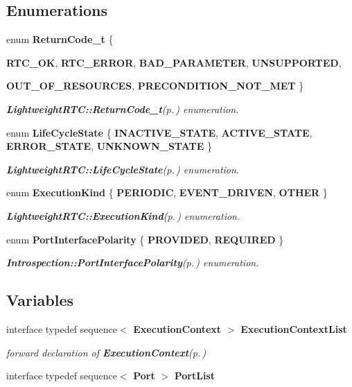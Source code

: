 \subsection*{Enumerations}
\begin{CompactItemize}
\item 
enum {\bf Return\-Code\_\-t} \{ \par
{\bf RTC\_\-OK}, 
{\bf RTC\_\-ERROR}, 
{\bf BAD\_\-PARAMETER}, 
{\bf UNSUPPORTED}, 
\par
{\bf OUT\_\-OF\_\-RESOURCES}, 
{\bf PRECONDITION\_\-NOT\_\-MET}
 \}
\begin{CompactList}\small\item\em {\bf Lightweight\-RTC::Return\-Code\_\-t}{\rm (p.\,\pageref{namespaceRTC_a28})} enumeration. \item\end{CompactList}\item 
enum {\bf Life\-Cycle\-State} \{ {\bf INACTIVE\_\-STATE}, 
{\bf ACTIVE\_\-STATE}, 
{\bf ERROR\_\-STATE}, 
{\bf UNKNOWN\_\-STATE}
 \}
\begin{CompactList}\small\item\em {\bf Lightweight\-RTC::Life\-Cycle\-State}{\rm (p.\,\pageref{namespaceRTC_a29})} enumeration. \item\end{CompactList}\item 
enum {\bf Execution\-Kind} \{ {\bf PERIODIC}, 
{\bf EVENT\_\-DRIVEN}, 
{\bf OTHER}
 \}
\begin{CompactList}\small\item\em {\bf Lightweight\-RTC::Execution\-Kind}{\rm (p.\,\pageref{namespaceRTC_a30})} enumeration. \item\end{CompactList}\item 
enum {\bf Port\-Interface\-Polarity} \{ {\bf PROVIDED}, 
{\bf REQUIRED}
 \}
\begin{CompactList}\small\item\em {\bf Introspection::Port\-Interface\-Polarity}{\rm (p.\,\pageref{namespaceRTC_a31})} enumeration. \item\end{CompactList}\end{CompactItemize}
\subsection*{Variables}
\begin{CompactItemize}
\item 
interface typedef sequence$<$ {\bf Execution\-Context} $>$ {\bf Execution\-Context\-List}
\begin{CompactList}\small\item\em forward declaration of {\bf Execution\-Context}{\rm (p.\,\pageref{interfaceRTC_1_1ExecutionContext})} \item\end{CompactList}\item 
interface typedef sequence$<$ {\bf Port} $>$ {\bf Port\-List}
\end{CompactItemize}


